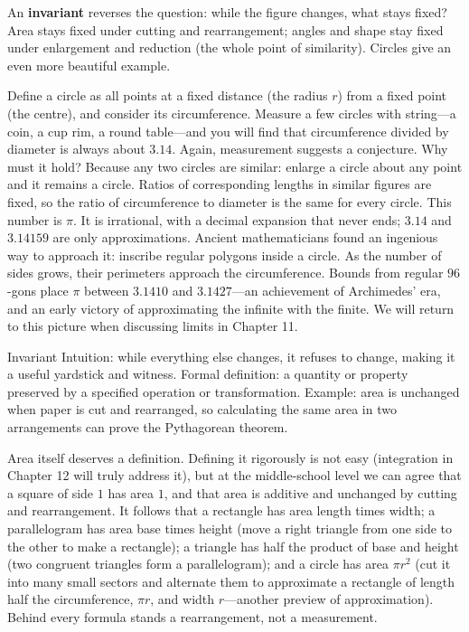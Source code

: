 An \textbf{invariant} reverses the question: while the figure changes, what stays fixed? Area stays fixed under cutting and rearrangement; angles and shape stay fixed under enlargement and reduction (the whole point of similarity). Circles give an even more beautiful example.

Define a circle as all points at a fixed distance (the radius $r$) from a fixed point (the centre), and consider its circumference. Measure a few circles with string---a coin, a cup rim, a round table---and you will find that circumference divided by diameter is always about $3.14$. Again, measurement suggests a conjecture. Why must it hold? Because any two circles are similar: enlarge a circle about any point and it remains a circle. Ratios of corresponding lengths in similar figures are fixed, so the ratio of circumference to diameter is the same for every circle. This number is $\pi$. It is irrational, with a decimal expansion that never ends; $3.14$ and $3.14159$ are only approximations. Ancient mathematicians found an ingenious way to approach it: inscribe regular polygons inside a circle. As the number of sides grows, their perimeters approach the circumference. Bounds from regular $96$-gons place $\pi$ between $3.1410$ and $3.1427$---an achievement of Archimedes' era, and an early victory of approximating the infinite with the finite. We will return to this picture when discussing limits in Chapter 11.

\begin{shuyu}{Invariant}
Intuition: while everything else changes, it refuses to change, making it a useful yardstick and witness.
Formal definition: a quantity or property preserved by a specified operation or transformation.
Example: area is unchanged when paper is cut and rearranged, so calculating the same area in two arrangements can prove the Pythagorean theorem.
\end{shuyu}

Area itself deserves a definition. Defining it rigorously is not easy (integration in Chapter 12 will truly address it), but at the middle-school level we can agree that a square of side $1$ has area $1$, and that area is additive and unchanged by cutting and rearrangement. It follows that a rectangle has area length times width; a parallelogram has area base times height (move a right triangle from one side to the other to make a rectangle); a triangle has half the product of base and height (two congruent triangles form a parallelogram); and a circle has area $\pi r^2$ (cut it into many small sectors and alternate them to approximate a rectangle of length half the circumference, $\pi r$, and width $r$---another preview of approximation). Behind every formula stands a rearrangement, not a measurement.

